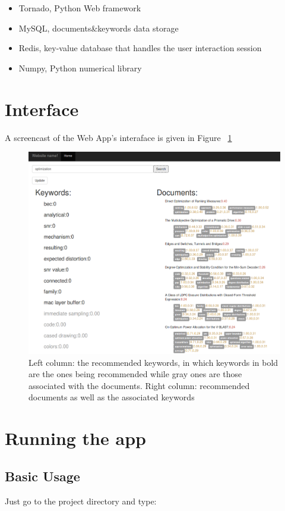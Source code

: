 \documentclass[10pt,a4paper]{article}
\begin{document}
\begin{itemize}
\item Tornado, Python Web framework
\item MySQL, documents\&keywords data storage
\item Redis, key-value database that handles the user interaction session
\item Numpy, Python numerical library
\end{itemize}

\section{Interface}

A screencast of the Web App's interaface is  given in Figure ~\ref{fig:interface}

\begin{figure}[H]
  \centering
  \includegraphics[scale=.25]{interface}
  \caption{Left column: the recommended keywords, in which keywords in bold are the ones being recommended while gray ones are those associated with the documents. Right column: recommended documents as well as the associated keywords}
  \label{fig:interface}
\end{figure}


\section{Running the app}
\subsection{Basic Usage}
Just go to the project directory and type:
\end{document}
